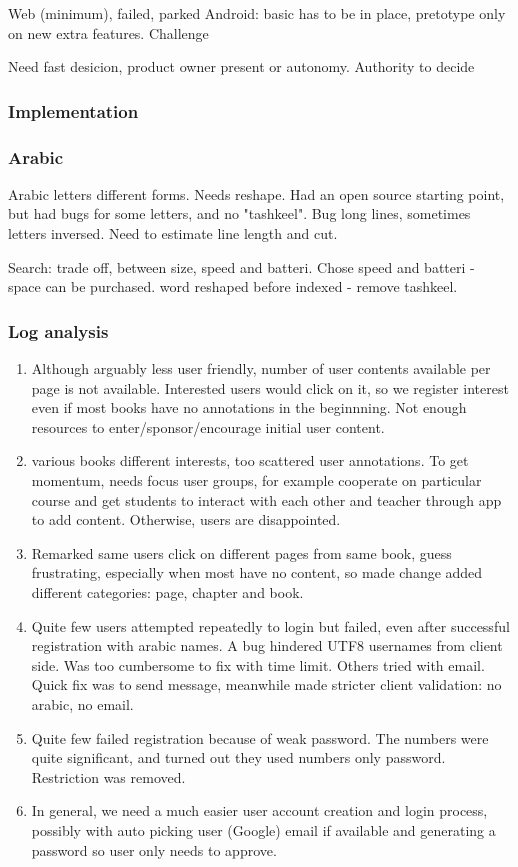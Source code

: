 \documentclass[a4paper,10pt]{book}
\begin{document}
Web (minimum), failed, parked
Android: basic has to be in place, pretotype only on new extra features. Challenge


Need fast desicion, product owner present or autonomy.
Authority to decide

\subsubsection{Implementation}
\subsubsection{Arabic}
Arabic letters different forms. Needs reshape. Had an open source starting point, but had bugs for some letters, and no "tashkeel".
Bug long lines, sometimes letters inversed.
Need to estimate line length and cut.

Search: trade off, between size, speed and batteri. Chose speed and batteri - space can be purchased.
word reshaped before indexed - remove tashkeel.


\subsubsection{Log analysis}

\begin{enumerate}
\item Although arguably less user friendly, number of user contents available per page is not available. Interested users would click on it, so
we register interest even if most books have no annotations in the beginnning. Not enough resources to enter/sponsor/encourage initial user 
content.
\item various books different interests, too scattered user annotations. To get momentum, needs focus user groups, for example cooperate on 
particular course and get students to interact with each other and teacher through app to add content. Otherwise, users are disappointed.
\item Remarked same users click on different pages from same book, guess frustrating, especially when most have no content, 
so made change added different categories: page, chapter and book.
\item Quite few users attempted repeatedly to login but failed, even after successful registration with arabic names. A bug hindered UTF8 
usernames from client side. Was too cumbersome to fix with time limit. Others tried with email. Quick fix was to send message, 
meanwhile made stricter client validation: no arabic, no email.
\item Quite few failed registration because of weak password. The numbers were quite significant, and turned out they used numbers only password.
Restriction was removed.
\item In general, we need a much easier user account creation and login process, possibly with auto picking user (Google) email if available
and generating a password so user only needs to approve.
\end{enumerate}
\end{document}
